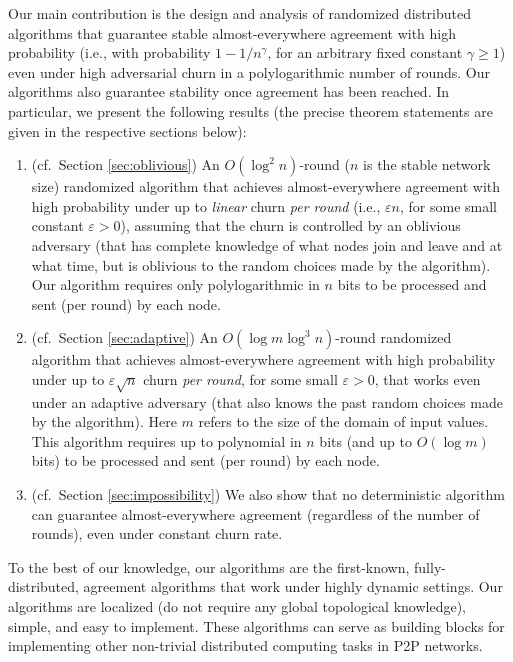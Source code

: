\documentclass[leqno,11pt]{article}
\renewcommand{\epsilon}{\varepsilon}
\renewcommand{\ge}{\geqslant}
\begin{document}
Our main contribution is the design and analysis of randomized  distributed
algorithms that guarantee   stable almost-everywhere agreement with high
probability (i.e., with probability $1 - 1/n^{\gamma}$, for an arbitrary fixed constant $\gamma\ge 1$) even under high
adversarial churn in a polylogarithmic number of
rounds.  Our algorithms also  guarantee stability once agreement has been
reached.  In particular, we present the following
results (the precise theorem statements are given in the respective sections
below):
\begin{enumerate}
\item (cf.\ Section \ref{sec:oblivious}) An $O(\log^2 n)$-round  ($n$ is the stable
network size) randomized algorithm that achieves almost-everywhere
agreement with high probability under up to {\em linear} churn {\em per round}
(i.e., $\epsilon n$, for some small constant $\epsilon > 0$), assuming
that the churn is controlled by an oblivious adversary (that has complete
knowledge of what nodes join and leave and  at what time, but is oblivious
to the random choices made by the algorithm). Our algorithm requires 
only polylogarithmic  in $n$  bits to be processed and sent (per round) by each node.

\item (cf.\ Section \ref{sec:adaptive}) An  $O(\log m \log^3 n)$-round
randomized algorithm that achieves almost-everywhere agreement with high
probability under up to $\epsilon \sqrt{n}$ churn {\em per round}, for some
small $\epsilon > 0$, that works even under an adaptive adversary (that also
knows the past random choices made by the algorithm). Here $m$ refers
to the size of the domain of input values. This algorithm requires up to polynomial in $n$ bits (and up to $O(\log m)$ bits)
to be processed and sent (per round) by each node. 

\item (cf.\ Section \ref{sec:impossibility}) We also show that no
deterministic algorithm can guarantee almost-everywhere agreement
(regardless of the number of rounds), even under constant churn rate. 
\end{enumerate}

To the best of our knowledge, our algorithms are the first-known,
fully-distributed,  agreement algorithms that work under highly dynamic
settings. Our algorithms are  localized (do not require any global topological
knowledge), simple, and easy to implement. 
 These algorithms can serve as building blocks for implementing other non-trivial
distributed computing tasks in P2P networks. 
\end{document}
